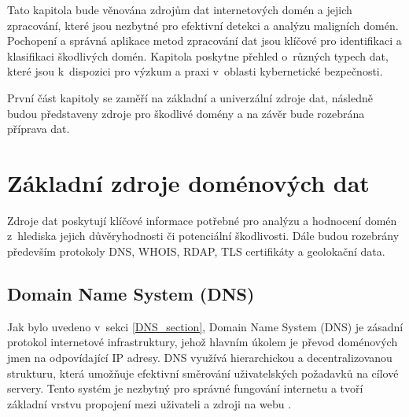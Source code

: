 Tato kapitola bude věnována zdrojům dat internetových domén a jejich zpracování, které jsou nezbytné pro efektivní detekci a analýzu maligních domén. Pochopení a správná aplikace metod zpracování dat jsou klíčové pro identifikaci a klasifikaci škodlivých domén. Kapitola poskytne přehled o~různých typech dat, které jsou k~dispozici pro výzkum a praxi v~oblasti kybernetické bezpečnosti.

První část kapitoly se zaměří na základní a univerzální zdroje dat, následně budou představeny zdroje pro škodlivé domény a na závěr bude rozebrána příprava dat. 




\section{Základní zdroje doménových dat}

Zdroje dat poskytují klíčové informace potřebné pro analýzu a hodnocení domén z~hlediska jejich důvěryhodnosti či potenciální škodlivosti. Dále budou rozebrány především protokoly DNS, WHOIS, RDAP, TLS certifikáty a geolokační data.


\subsection{Domain Name System (DNS)}
Jak bylo uvedeno v~sekci \ref{DNS_section}, Domain Name System (DNS) je zásadní protokol internetové infrastruktury, jehož hlavním úkolem je převod doménových jmen na odpovídající IP adresy. DNS využívá hierarchickou a decentralizovanou strukturu, která umožňuje efektivní směrování uživatelských požadavků na cílové servery. Tento systém je nezbytný pro správné fungování internetu a tvoří základní vrstvu propojení mezi uživateli a zdroji na webu \cite{postel1983domain2}.

